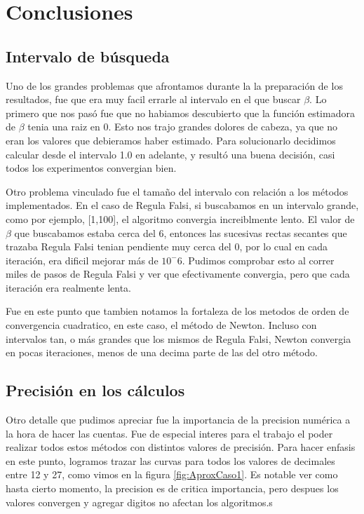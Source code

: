 \section{Conclusiones}

\subsection{Intervalo de b\'usqueda}


Uno de los grandes problemas que afrontamos durante la la preparaci\'on de los 
resultados, fue que era muy facil errarle al intervalo en el que buscar
$\beta$. Lo primero que nos pas\'o fue
que no habiamos descubierto que la funci\'on estimadora de $\beta$ tenia una 
raiz en 0. Esto nos trajo grandes
dolores de cabeza, ya que no eran los valores que debieramos haber estimado. 
Para solucionarlo decidimos calcular
desde el intervalo 1.0 en adelante, y result\'o una buena decisi\'on, casi 
todos los experimentos convergian bien.

Otro problema vinculado fue el tama\~no del intervalo con relaci\'on a los 
m\'etodos implementados. 
En el caso de Regula Falsi, si buscabamos en un intervalo grande, como por 
ejemplo, [1,100], el algoritmo 
convergia increiblmente lento. El valor de $\beta$ que buscabamos estaba cerca 
del 6, entonces las 
sucesivas rectas secantes que trazaba Regula Falsi tenian pendiente muy cerca 
del 0, por lo cual en cada 
iteraci\'on, era dificil mejorar m\'as de $10^-6$. Pudimos comprobar esto al 
correr miles de pasos de Regula Falsi y ver que efectivamente convergia, pero
que cada iteraci\'on era realmente lenta.

Fue en este punto que tambien notamos la fortaleza de los metodos de orden de 
convergencia cuadratico,
en este caso, el m\'etodo de Newton. Incluso con intervalos tan, o m\'as 
grandes que los mismos de Regula Falsi, 
Newton convergia en pocas iteraciones, menos de una decima parte de las del 
otro m\'etodo.


\subsection{Precisi\'on en los c\'alculos}

Otro detalle que pudimos apreciar fue la importancia de la precision num\'erica 
a la hora de hacer las cuentas. 
Fue de especial interes para el trabajo el poder realizar todos estos m\'etodos 
con distintos valores 
de precisi\'on. Para hacer enfasis en este punto, logramos trazar las curvas 
para todos los valores de decimales 
entre 12 y 27, como vimos en la figura \ref{fig:AproxCaso1}.
Es notable ver como hasta cierto momento, la precision es de critica 
importancia, pero despues los valores convergen y 
agregar digitos no afectan los algoritmos.s

